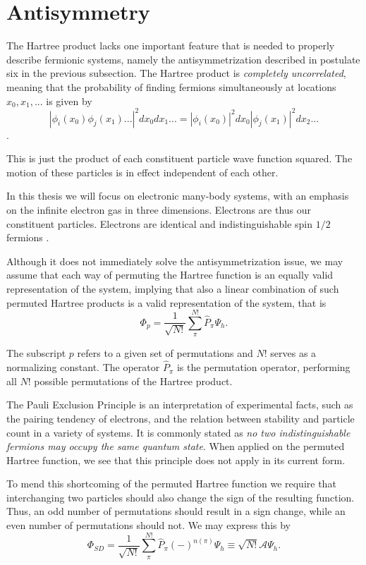 \section{Antisymmetry}

The Hartree product lacks one important feature that is needed to
properly describe fermionic systems, namely the antisymmetrization
described in postulate six in the previous subsection. The Hartree
product is \emph{completely uncorrelated}, meaning that the
probability of finding fermions simultaneously at locations
$x_0,x_1,...$ is given by
$$|\phi_i(x_0)\phi_j(x_1)...|^2 dx_0 dx_1 ... = |\phi_i(x_0)|^2 dx_0 |\phi_j(x_1)|^2 dx_2 ...$$.

This is just the product of each constituent particle wave function squared. The motion of these particles is in effect independent of each other.

In this thesis we will focus on electronic many-body systems, with an emphasis on the infinite electron gas in three dimensions.
Electrons are thus our constituent particles. Electrons are identical and indistinguishable spin $1/2$ fermions \cite{Griffiths2005}. 

Although it does not immediately solve the antisymmetrization issue,
we may assume that each way of permuting the Hartree
function is an equally valid representation of the system, implying that
also a linear combination of such permuted Hartree products is a valid
representation of the system, that is
\begin{equation}
 \Phi_p = \frac{1}{\sqrt{N!}} \sum_{\pi}^{N!} \hat{P}_{\pi} \Psi_h.
\label{eqn:hartreeperm}
\end{equation}

The subscript $p$ refers to a given set of permutations and $N!$ serves as a normalizing constant. The operator $\hat{P}_{\pi}$ is the permutation operator, performing all $N!$ possible permutations of the Hartree product. 

The Pauli Exclusion Principle is an interpretation of experimental facts, such as the pairing tendency of electrons, and the relation between stability and particle count in a variety of systems. It is commonly stated as \emph{no two indistinguishable fermions may occupy the same quantum state}. When applied on the permuted Hartree function, we see that this principle does not apply in its current form.

To mend this shortcoming of the permuted Hartree function we require
that interchanging two particles should also change the sign of the
resulting function. Thus, an odd number of permutations should result
in a sign change, while an even number of permutations should not. We
may express this by
\begin{equation}
 \Phi_{SD} = \frac{1}{\sqrt{N!}} \sum_{\pi}^{N!} \hat{P}_{\pi} (-)^{n(\pi)}\Psi_h \equiv \sqrt{N!} \mathcal{A} \Psi_h.
\label{eqn:slaterdet}
\end{equation}


